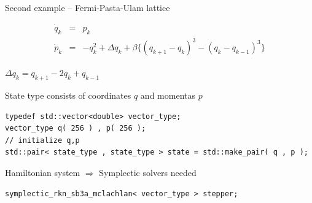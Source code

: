 


\begin{frame}[fragile]{Second example -- Fermi-Pasta-Ulam lattice}
 
  \vspace{-4ex} 
 
  \begin{eqnarray}
   \dot{q}_k & = & p_k  \nonumber \\
   \dot{p}_k & = & - q_k^2 + \Delta q_k + \beta \big\{ ( q_{k+1} - q_k )^3 - ( q_k - q_{k-1} )^3 \big\} \nonumber
  \end{eqnarray}

  \centerline{ $\Delta q_k = q_{k+1} -2 q_k + q_{k-1}$}

  \vspace{4ex}

  \pause

State type consists of coordinates $q$ and momentas $p$

  \vspace{1ex}

  \begin{lstlisting}
typedef std::vector<double> vector_type;
vector_type q( 256 ) , p( 256 );
// initialize q,p
std::pair< state_type , state_type > state = std::make_pair( q , p );
  \end{lstlisting}

  \pause

  \vspace{2ex}

  Hamiltonian system $\Longrightarrow{}$ Symplectic solvers needed

  \vspace{1ex}

  \begin{lstlisting}
symplectic_rkn_sb3a_mclachlan< vector_type > stepper;
  \end{lstlisting}


\end{frame}

